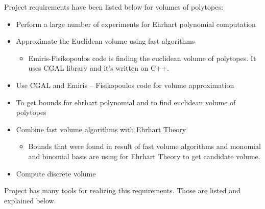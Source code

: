 \documentclass[12pt,twoside]{article}
\begin{document}
Project requirements have been listed below for volumes of polytopes: \newline
\begin{itemize}
	\item Perform a large number of experiments for Ehrhart polynomial computation
	\item Approximate the Euclidean volume using fast algorithms
	\begin{itemize}
		\item Emiris-Fisikopoulos code is finding the euclidean volume of polytopes. It uses CGAL library and it's written on C++.
	\end{itemize}
	\item Use CGAL and Emiris – Fisikopoulos code for volume approximation
	\item To get bounds for ehrhart polynomial and to find euclidean volume of polytopes
	\item Combine fast volume algorithms with Ehrhart Theory
	\begin{itemize}
		\item Bounds that were found in result of fast volume algorithms and
monomial and binomial basis are using for Ehrhart Theory to get
candidate volume.

	\end{itemize}
	\item Compute discrete volume
	\end{itemize} 
\par	
	Project has many tools for realizing this requirements. Those are listed and
explained below.
\end{document}
